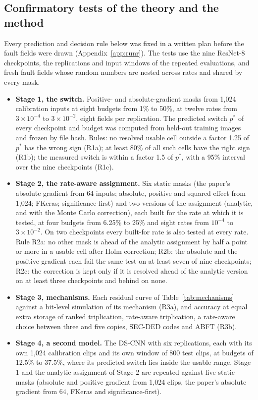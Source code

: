 \subsection{Confirmatory tests of the theory and the method}\label{sec:runr}
Every prediction and decision rule below was fixed in a written plan before the fault fields were drawn (Appendix~\ref{app:runr}). The tests use the nine ResNet-8 checkpoints, the replications and input windows of the repeated evaluations, and fresh fault fields whose random numbers are nested across rates and shared by every mask.
\begin{itemize}
\item \textbf{Stage 1, the switch.} Positive- and absolute-gradient masks from 1,024 calibration inputs at eight budgets from 1\% to 50\%, at twelve rates from $3\times10^{-4}$ to $3\times10^{-2}$, eight fields per replication. The predicted switch $p^*$ of every checkpoint and budget was computed from held-out training images and frozen by file hash. Rules: no resolved usable cell outside a factor 1.25 of $p^*$ has the wrong sign (R1a); at least 80\% of all such cells have the right sign (R1b); the measured switch is within a factor 1.5 of $p^*$, with a 95\% interval over the nine checkpoints (R1c).
\item \textbf{Stage 2, the rate-aware assignment.} Six static masks (the paper's absolute gradient from 64 inputs; absolute, positive and squared effect from 1,024; FKeras; significance-first) and two versions of the assignment (analytic, and with the Monte Carlo correction), each built for the rate at which it is tested, at four budgets from 6.25\% to 25\% and eight rates from $10^{-4}$ to $3\times10^{-2}$. On two checkpoints every built-for rate is also tested at every rate. Rule R2a: no other mask is ahead of the analytic assignment by half a point or more in a usable cell after Holm correction; R2b: the absolute and the positive gradient each fail the same test on at least seven of nine checkpoints; R2c: the correction is kept only if it is resolved ahead of the analytic version on at least three checkpoints and behind on none.
\item \textbf{Stage 3, mechanisms.} Each residual curve of Table~\ref{tab:mechanisms} against a bit-level simulation of its mechanism (R3a), and accuracy at equal extra storage of ranked triplication, rate-aware triplication, a rate-aware choice between three and five copies, SEC-DED codes and ABFT (R3b).
\item \textbf{Stage 4, a second model.} The DS-CNN with six replications, each with its own 1,024 calibration clips and its own window of 800 test clips, at budgets of 12.5\% to 37.5\%, where its predicted switch lies inside the usable range. Stage 1 and the analytic assignment of Stage 2 are repeated against five static masks (absolute and positive gradient from 1,024 clips, the paper's absolute gradient from 64, FKeras and significance-first). 
\end{itemize}

